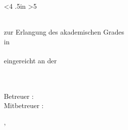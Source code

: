 \thispagestyle{empty}
\ifnum\numcomm<4 \vglue .5in\vfil \fi  %
\ifnum\numcomm>5 \hbox{ } \vspace{-24pt}\fi %
\begin{singlespace}
\begin{center}
    {\LARGE\bfseries\mytitle}

    {\large\bfseries\mysubtitle}

    \vfill\vfill\vfill\vfill

    {\normalsize\bfseries\myworktitle}\\
    \vfill
    zur Erlangung des akademischen Grades
    {\mygrade}\\
    in\\
    {\mystudy}\\
    \bigskip
    \vfill
    eingereicht an der
    {\normalsize\bfseries\myuniversity}\\
    \medskip
    \myfaculty\\
    \smallskip
    \myinstitute\\


    \vfill\vfill\vfill
    \vfill\vfill\vfill

    Betreuer :
    \mysupervisor\\
    \vfill
    Mitbetreuer :
    \mycosupervisor\\
    \vfill
    \vfill

    \vfill


    \vfill\vfill\vfill

    {\scriptsize\mysubmissiontown, \mysubmissionmonth~\mysubmissionyear}
\end{center}
\end{singlespace}
\newpage
\pagestyle{plain}
